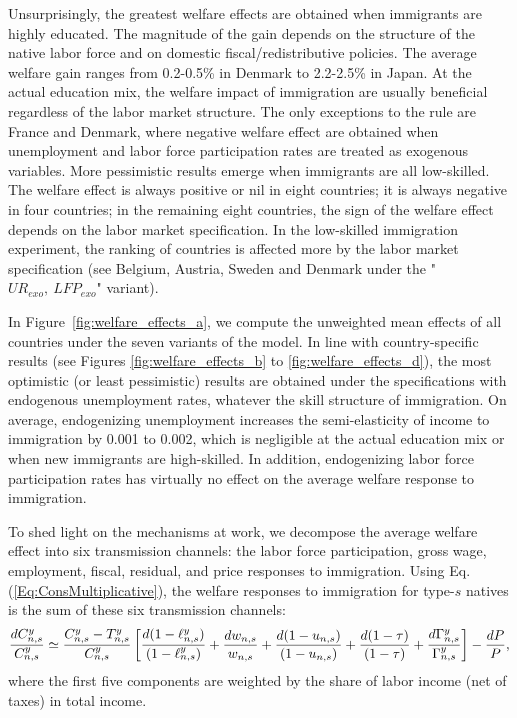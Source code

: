 \documentclass[a4paper,12pt]{article}
\begin{document}
Unsurprisingly, the greatest welfare effects are obtained when immigrants are highly educated. The magnitude of the gain depends on the structure of the native labor force and on domestic fiscal/redistributive policies. The average welfare gain ranges from 0.2-0.5\% in Denmark to 2.2-2.5\% in Japan. At the actual education mix, the welfare impact of immigration are usually beneficial regardless of the labor market structure. The only exceptions to the rule are France and Denmark, where negative welfare effect are obtained when unemployment and labor force participation rates are treated as exogenous variables. More pessimistic results emerge when immigrants are all low-skilled. The welfare effect is always positive or nil in eight countries; it is always negative in four countries; in the remaining eight countries, the sign of the welfare effect depends on the labor market specification. In the low-skilled immigration experiment, the ranking of countries is affected more by the labor market specification (see Belgium, Austria, Sweden and Denmark under the "$UR_{exo},~LFP_{exo}$" variant).

In Figure~\ref{fig:welfare_effects_a}, we compute the unweighted mean effects of all countries under the seven variants of the model. In line with country-specific results (see Figures \ref{fig:welfare_effects_b} to \ref{fig:welfare_effects_d}), the most optimistic (or least pessimistic) results are obtained under the specifications with endogenous unemployment rates, whatever the skill structure of immigration. On average, endogenizing unemployment increases the semi-elasticity of income to immigration by 0.001 to 0.002, which is negligible at the actual education mix or when new immigrants are high-skilled. In addition, endogenizing labor force participation rates has virtually no effect on the average welfare response to immigration.

To shed light on the mechanisms at work, we decompose the average welfare effect into six transmission channels: the labor force participation, gross wage, employment, fiscal, residual, and price responses to immigration. Using Eq. (\ref{Eq:ConsMultiplicative}), the welfare responses to immigration for type-$s$ natives is the sum of these six transmission channels:%
\begin{equation}
\frac{dC_{n,s}^{y}}{C_{n,s}^{y}}\simeq \frac{C_{n,s}^{y}-T_{n,s}^{y}}{%
C_{n,s}^{y}}\left[ \frac{d(1-\ell _{n,s}^{y})}{(1-\ell _{n,s}^{y})}+\frac{%
dw_{n,s}}{w_{n,s}}+\frac{d(1-u_{n,s})}{(1-u_{n,s})}+\frac{d(1-\tau )}{%
(1-\tau )}+\frac{d\Gamma _{n,s}^{y}}{\Gamma _{n,s}^{y}}\right] -\frac{dP}{P},
\label{Eq:DecompPrivateCons}
\end{equation}%
where the first five components are weighted by the share of labor income (net of taxes) in total income.
\end{document}
